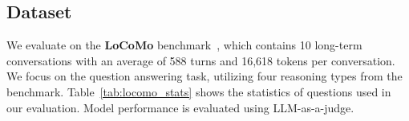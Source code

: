 



\subsection{Dataset} \label{dataset}
We evaluate on the \textbf{LoCoMo} benchmark~\cite{maharana2024evaluating}, which contains 10 long-term conversations with an average of 588 turns and 16,618 tokens per conversation. We focus on the question answering task, utilizing four reasoning types from the benchmark. Table~\ref{tab:locomo_stats} shows the statistics of questions used in our evaluation. Model performance is evaluated using LLM-as-a-judge.




